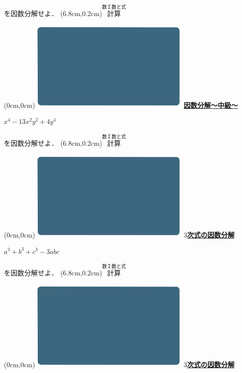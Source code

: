 \documentclass[10pt,
fleqn,
dvipdfmx,
uplatex
]{jsarticle}
\begin{document}
\Large
\vspace{1zw}
\hfill を因数分解せよ．
\at(6.8cm,0.2cm){\small\color{bradorange}$\overset{\text{数Ｉ数と式}}{\text{計算}}$}


\newpage



\at(0cm,0cm){\includegraphics[width=8cm,bb=0 0 1920 1080]{./thumbnails/templates/smart_background/数I数と式.jpeg}}
{\color{orange}\bf\boldmath\huge\underline{因数分解〜中級〜}}\vspace{0.5zw}

\HUGE 
\bf\boldmath $x^4-{13}x^2y^2+4y^4$

\Large
\vspace{1zw}
\hfill を因数分解せよ．
\at(6.8cm,0.2cm){\small\color{bradorange}$\overset{\text{数Ｉ数と式}}{\text{計算}}$}


\newpage



\at(0cm,0cm){\includegraphics[width=8cm,bb=0 0 1920 1080]{./thumbnails/templates/smart_background/数I数と式.jpeg}}
{\color{orange}\bf\boldmath\huge\underline{$3$次式の因数分解}}\vspace{0.5zw}

\HUGE 
\bf\boldmath $a^3+b^3+c^3-3abc$

\Large
\vspace{1zw}
\hfill を因数分解せよ．
\at(6.8cm,0.2cm){\small\color{bradorange}$\overset{\text{数Ｉ数と式}}{\text{計算}}$}


\newpage



\at(0cm,0cm){\includegraphics[width=8cm,bb=0 0 1920 1080]{./thumbnails/templates/smart_background/数I数と式.jpeg}}
{\color{orange}\bf\boldmath\huge\underline{$3$次式の因数分解}}\vspace{0.5zw}
\end{document}
